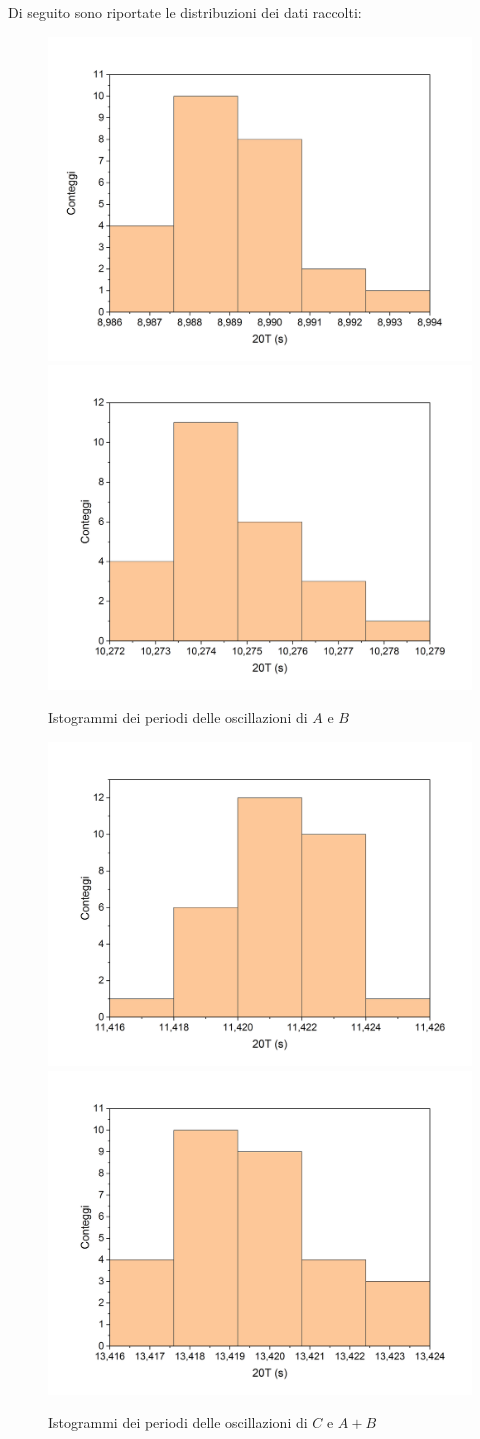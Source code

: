 \documentclass{article}
\begin{document}
Di seguito sono riportate le distribuzioni dei dati raccolti:

\begin{figure}[H]
    \includegraphics[trim={2cm 1.8cm .7cm 1.5cm},width=.5\textwidth]{Dinamico1.jpg}
    \includegraphics[trim={.7cm 1.8cm 2cm 1.5cm},width=.5\textwidth]{Dinamico2.jpg}
    \caption{Istogrammi dei periodi delle oscillazioni di $A$ e $B$}
\end{figure}\begin{figure}[H]
    \includegraphics[trim={2cm 1.8cm .7cm 1.5cm},width=.5\textwidth]{Dinamico3.jpg}
    \includegraphics[trim={.7cm 1.8cm 2cm 1.5cm},width=.5\textwidth]{Dinamico4.jpg}
    \caption{Istogrammi dei periodi delle oscillazioni di $C$ e $A+B$}
\end{figure}
\end{document}
